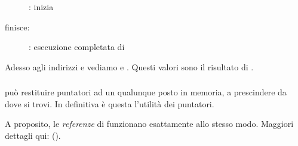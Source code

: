 \begin{figure}[H]
\centering
{}
\caption{\olly: inizia \ttfone}
\label{fig:pointers_olly_stk_2}
\end{figure}

\clearpage
\ttfone finisce:

\begin{figure}[H]
\centering
{}
\caption{\olly: esecuzione completata di \ttfone}
\label{fig:pointers_olly_stk_3}
\end{figure}

Adesso agli indirizzi  e  vediamo  e .
Questi valori sono il risultato di \ttfone.

\subsubsection{\Conclusion{}}
 
\ttfone può restituire puntatori ad un qualunque posto in memoria, a prescindere da dove si trovi.
In definitiva è questa l'utilità dei puntatori.

A proposito, le \emph{referenze} di \Cpp funzionano esattamente allo stesso modo.
Maggiori dettagli qui: ().
